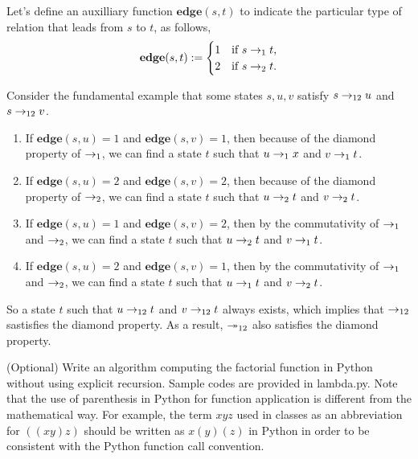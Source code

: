 \documentclass{homework}
\begin{document}
\begin{solution}

  Let's define an auxilliary function $\mathbf{edge}(s, t)$
  to indicate the particular type of relation that leads from $s$ to $t$,
  as follows,
  \begin{equation*}
    \mathbf{edge}(s, t):= \begin{cases}
      1 & \text{if } s \rightarrow_{1} t,\\
      2 & \text{if } s \rightarrow_{2} t.
    \end{cases}
  \end{equation*}

  Consider the fundamental example that
  some states $s, u, v$ satisfy $s \rightarrow_{12} u$ and $s \rightarrow_{12} v$.
  
  \begin{enumerate}
    \item If $\mathbf{edge}(s, u) = 1$ and $\mathbf{edge}(s, v) = 1$,
    then because of the diamond property of $\rightarrow_{1}$,
    we can find a state $t$ such that $u \rightarrow_{1} x$ and $v \rightarrow_{1} t$.
    \item If $\mathbf{edge}(s, u) = 2$ and $\mathbf{edge}(s, v) = 2$, 
    then because of the diamond property of $\rightarrow_{2}$,
    we can find a state $t$ such that $u \rightarrow_{2} t$ and $v \rightarrow_{2} t$.
    \item If $\mathbf{edge}(s, u) = 1$ and $\mathbf{edge}(s, v) = 2$,
    then by the commutativity of $\rightarrow_{1}$ and $\rightarrow_{2}$,
    we can find a state $t$ such that $u \rightarrow_{2} t$ and $v \rightarrow_{1} t$.
    \item If $\mathbf{edge}(s, u) = 2$ and $\mathbf{edge}(s, v) = 1$,
    then by the commutativity of $\rightarrow_{1}$ and $\rightarrow_{2}$,
    we can find a state $t$ such that $u \rightarrow_{1} t$ and $v \rightarrow_{2} t$.
  \end{enumerate}

  So a state $t$ such that $u \rightarrow_{12} t$ and $v \rightarrow_{12} t$ always exists,
  which implies that $\rightarrow_{12}$ sastisfies the diamond property.
  As a result, $\twoheadrightarrow_{12}$ also satisfies the diamond property.

\end{solution}

\begin{problem}
  (Optional) Write an algorithm computing the factorial function in Python
  without using explicit recursion.
  Sample codes are provided in \textsf{lambda.py}.
  Note that the use of parenthesis in Python for function application is
  different from the mathematical way.
  For example, the term $xyz$ used in classes as an abbreviation for $((xy)z)$
  should be written as $x(y)(z)$ in Python in order to be consistent with the
  Python function call convention.
\end{problem}
\end{document}
